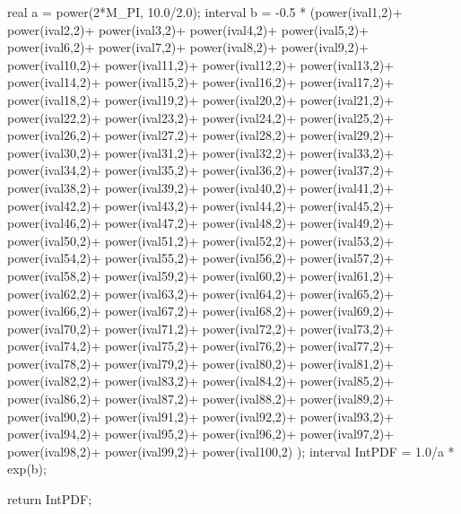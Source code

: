 \begin{DoxyCode}
{
  real a = power(2*M_PI, 10.0/2.0);
   interval b = -0.5 * (power(ival1,2)+
power(ival2,2)+
power(ival3,2)+
power(ival4,2)+
power(ival5,2)+
power(ival6,2)+
power(ival7,2)+
power(ival8,2)+
power(ival9,2)+
power(ival10,2)+
power(ival11,2)+
power(ival12,2)+
power(ival13,2)+
power(ival14,2)+
power(ival15,2)+
power(ival16,2)+
power(ival17,2)+
power(ival18,2)+
power(ival19,2)+
power(ival20,2)+
power(ival21,2)+
power(ival22,2)+
power(ival23,2)+
power(ival24,2)+
power(ival25,2)+
power(ival26,2)+
power(ival27,2)+
power(ival28,2)+
power(ival29,2)+
power(ival30,2)+
power(ival31,2)+
power(ival32,2)+
power(ival33,2)+
power(ival34,2)+
power(ival35,2)+
power(ival36,2)+
power(ival37,2)+
power(ival38,2)+
power(ival39,2)+
power(ival40,2)+
power(ival41,2)+
power(ival42,2)+
power(ival43,2)+
power(ival44,2)+
power(ival45,2)+
power(ival46,2)+
power(ival47,2)+
power(ival48,2)+
power(ival49,2)+
power(ival50,2)+
power(ival51,2)+
power(ival52,2)+
power(ival53,2)+
power(ival54,2)+
power(ival55,2)+
power(ival56,2)+
power(ival57,2)+
power(ival58,2)+
power(ival59,2)+
power(ival60,2)+
power(ival61,2)+
power(ival62,2)+
power(ival63,2)+
power(ival64,2)+
power(ival65,2)+
power(ival66,2)+
power(ival67,2)+
power(ival68,2)+
power(ival69,2)+
power(ival70,2)+
power(ival71,2)+
power(ival72,2)+
power(ival73,2)+
power(ival74,2)+
power(ival75,2)+
power(ival76,2)+
power(ival77,2)+
power(ival78,2)+
power(ival79,2)+
power(ival80,2)+
power(ival81,2)+
power(ival82,2)+
power(ival83,2)+
power(ival84,2)+
power(ival85,2)+
power(ival86,2)+
power(ival87,2)+
power(ival88,2)+
power(ival89,2)+
power(ival90,2)+
power(ival91,2)+
power(ival92,2)+
power(ival93,2)+
power(ival94,2)+
power(ival95,2)+
power(ival96,2)+
power(ival97,2)+
power(ival98,2)+
power(ival99,2)+
power(ival100,2)
);
   interval IntPDF = 1.0/a * exp(b);

  return IntPDF;
}
\end{DoxyCode}
